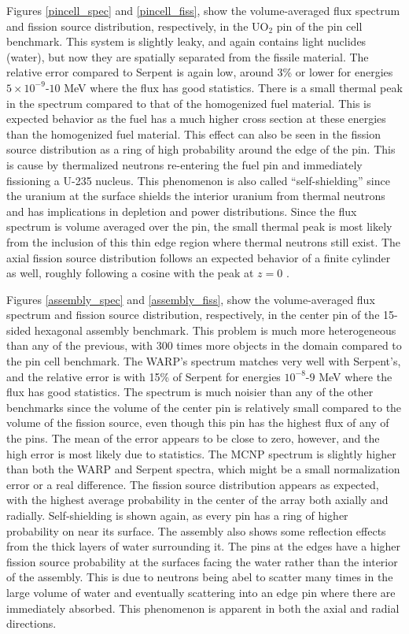 Figures \ref{pincell_spec} and \ref{pincell_fiss}, show the volume-averaged flux spectrum and fission source distribution, respectively, in the UO$_2$ pin of the pin cell benchmark.  This system is slightly leaky, and again contains light nuclides (water), but now they are spatially separated from the fissile material.  The relative error compared to Serpent is again low, around 3\% or lower for energies $5\times10^{-9}$-$10$ MeV where the flux has good statistics.  There is a small thermal peak in the spectrum compared to that of the homogenized fuel material.  This is expected behavior as the fuel has a much higher cross section at these energies than the homogenized fuel material.  This effect can also be seen in the fission source distribution as a ring of high probability around the edge of the pin.  This is cause by thermalized neutrons re-entering the fuel pin and immediately fissioning a U-235 nucleus.  This phenomenon is also called ``self-shielding'' since the uranium at the surface shields the interior uranium from thermal neutrons and has implications in depletion and power distributions.  Since the flux spectrum is volume averaged over the pin, the small thermal peak is most likely from the inclusion of this thin edge region where thermal neutrons still exist.  The axial fission source distribution follows an expected behavior of a finite cylinder as well, roughly following a cosine with the peak at $z=0$ \cite{duderstadt}.

Figures \ref{assembly_spec} and \ref{assembly_fiss}, show the volume-averaged flux spectrum and fission source distribution, respectively, in the center pin of the 15-sided hexagonal assembly benchmark.  This problem is much more heterogeneous than any of the previous, with 300 times more objects in the domain compared to the pin cell benchmark.  The WARP's spectrum matches very well with Serpent's, and the relative error is with 15\% of Serpent  for energies $10^{-8}$-$9$ MeV where the flux has good statistics.  The spectrum is much noisier than any of the other benchmarks since the volume of the center pin is relatively small compared to the volume of the fission source, even though this pin has the highest flux of any of the pins.  The mean of the error appears to be close to zero, however, and the high error is most likely due to statistics.  The MCNP spectrum is slightly higher than both the WARP and Serpent spectra, which might be a small normalization error or a real difference.  The fission source distribution appears as expected, with the highest average probability in the center of the array both axially and radially.  Self-shielding is shown again, as every pin has a ring of higher probability on near its surface.  The assembly also shows some reflection effects from the thick layers of water surrounding it.  The pins at the edges have a higher fission source probability at the surfaces facing the water rather than the interior of the assembly.  This is due to neutrons being abel to scatter many times in the large volume of water and eventually scattering into an edge pin where there are immediately absorbed.  This phenomenon is apparent in both the axial and radial directions.


